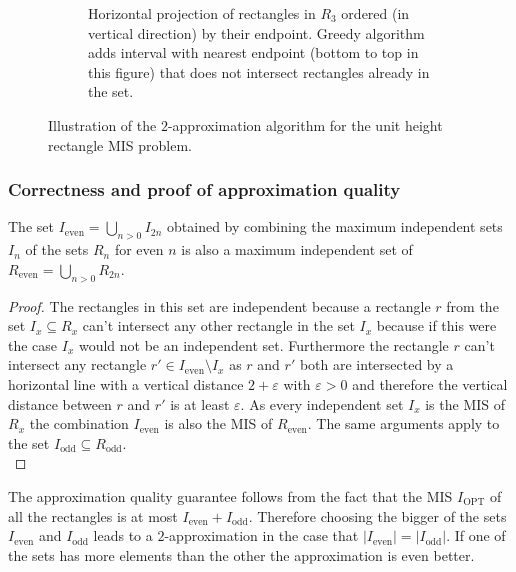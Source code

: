 \begin{figure*}[!h]
\begin{subfigure}[t]{0.5\textwidth}
\caption{Horizontal projection of rectangles in $R_3$ ordered (in vertical direction) by their endpoint. Greedy algorithm adds interval with nearest endpoint (bottom to top in this figure) that does not intersect rectangles already in the set.}
\label{fig:uhr1d}
\end{subfigure}

    \caption{Illustration of the $2$-approximation algorithm for the unit height rectangle MIS problem.}\label{fig:uhr1}
\end{figure*}


\subsubsection{Correctness and proof of approximation quality}
\begin{theorem}
The set $I_{\text{even}} = \bigcup_{n> 0} I_{2n}$ obtained by combining the maximum independent sets $I_{n}$ of the sets $R_{n}$ for even $n$ is also a maximum independent set of $R_{\text{even}} = \bigcup_{n>0}R_{2n}$.
\end{theorem}
\begin{proof}
 The rectangles in this set are independent because a rectangle $r$ from the set $I_x\subseteq R_x$ can't intersect any other rectangle in the set $I_x$ because if this were the case $I_x$ would not be an independent set. Furthermore the rectangle $r$ can't intersect any rectangle $r'\in I_\text{even}\setminus I_x$ as $r$ and $r'$ both are intersected by a horizontal line with a vertical distance $2+\varepsilon$ with $\varepsilon>0$ and therefore the vertical distance between $r$ and $r'$ is at least $\varepsilon$. As every independent set $I_x$ is the MIS of $R_x$ the combination $I_\text{even}$ is also the MIS of $R_\text{even}$. The same arguments apply to the set $I_\text{odd}\subseteq R_\text{odd}$.\\
\end{proof}
The approximation quality guarantee follows from the fact that the MIS $I_\text{OPT}$ of all the rectangles is at most $I_\text{even} + I_\text{odd}$. Therefore choosing the bigger of the sets $I_\text{even}$ and $I_\text{odd}$ leads to a $2$-approximation in the case that $|I_\text{even}| = |I_\text{odd}|$. If one of the sets has more elements than the other the approximation is even better. 

